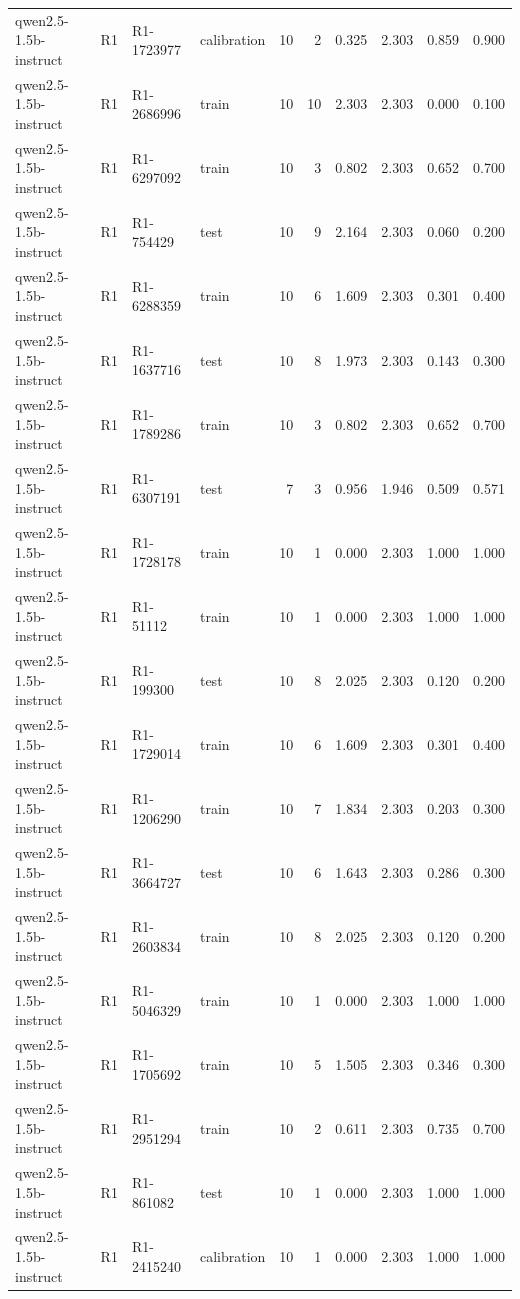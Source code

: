 \begin{table}
\begin{tabular}{llllrrrrrr}
qwen2.5-1.5b-instruct & R1 & R1-1723977 & calibration & 10 & 2 & 0.325 & 2.303 & 0.859 & 0.900 \\
qwen2.5-1.5b-instruct & R1 & R1-2686996 & train & 10 & 10 & 2.303 & 2.303 & 0.000 & 0.100 \\
qwen2.5-1.5b-instruct & R1 & R1-6297092 & train & 10 & 3 & 0.802 & 2.303 & 0.652 & 0.700 \\
qwen2.5-1.5b-instruct & R1 & R1-754429 & test & 10 & 9 & 2.164 & 2.303 & 0.060 & 0.200 \\
qwen2.5-1.5b-instruct & R1 & R1-6288359 & train & 10 & 6 & 1.609 & 2.303 & 0.301 & 0.400 \\
qwen2.5-1.5b-instruct & R1 & R1-1637716 & test & 10 & 8 & 1.973 & 2.303 & 0.143 & 0.300 \\
qwen2.5-1.5b-instruct & R1 & R1-1789286 & train & 10 & 3 & 0.802 & 2.303 & 0.652 & 0.700 \\
qwen2.5-1.5b-instruct & R1 & R1-6307191 & test & 7 & 3 & 0.956 & 1.946 & 0.509 & 0.571 \\
qwen2.5-1.5b-instruct & R1 & R1-1728178 & train & 10 & 1 & 0.000 & 2.303 & 1.000 & 1.000 \\
qwen2.5-1.5b-instruct & R1 & R1-51112 & train & 10 & 1 & 0.000 & 2.303 & 1.000 & 1.000 \\
qwen2.5-1.5b-instruct & R1 & R1-199300 & test & 10 & 8 & 2.025 & 2.303 & 0.120 & 0.200 \\
qwen2.5-1.5b-instruct & R1 & R1-1729014 & train & 10 & 6 & 1.609 & 2.303 & 0.301 & 0.400 \\
qwen2.5-1.5b-instruct & R1 & R1-1206290 & train & 10 & 7 & 1.834 & 2.303 & 0.203 & 0.300 \\
qwen2.5-1.5b-instruct & R1 & R1-3664727 & test & 10 & 6 & 1.643 & 2.303 & 0.286 & 0.300 \\
qwen2.5-1.5b-instruct & R1 & R1-2603834 & train & 10 & 8 & 2.025 & 2.303 & 0.120 & 0.200 \\
qwen2.5-1.5b-instruct & R1 & R1-5046329 & train & 10 & 1 & 0.000 & 2.303 & 1.000 & 1.000 \\
qwen2.5-1.5b-instruct & R1 & R1-1705692 & train & 10 & 5 & 1.505 & 2.303 & 0.346 & 0.300 \\
qwen2.5-1.5b-instruct & R1 & R1-2951294 & train & 10 & 2 & 0.611 & 2.303 & 0.735 & 0.700 \\
qwen2.5-1.5b-instruct & R1 & R1-861082 & test & 10 & 1 & 0.000 & 2.303 & 1.000 & 1.000 \\
qwen2.5-1.5b-instruct & R1 & R1-2415240 & calibration & 10 & 1 & 0.000 & 2.303 & 1.000 & 1.000 \\

\end{tabular}
\end{table}
